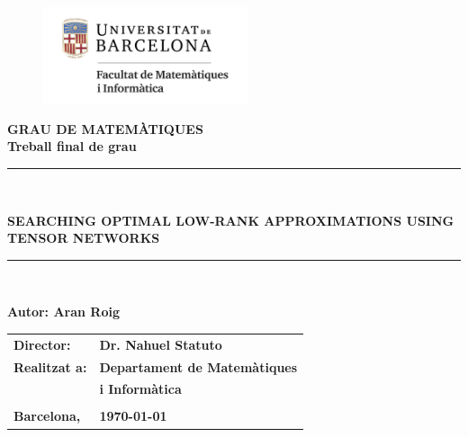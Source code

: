\documentclass[11pt,a4paper,openright,oneside]{book}
\numberwithin{equation}{section}
\begin{document}

\thispagestyle{empty}

\begin{titlepage}
\begin{center}
\begin{figure}[htb]
\begin{center}
\includegraphics[width=6cm]{matematiquesinformatica-pos-rgb.png}
\end{center}
\end{figure}

\vspace*{1cm}
\textbf{\LARGE GRAU DE MATEM\`{A}TIQUES } \\
\vspace*{.5cm}
\textbf{\LARGE Treball final de grau} \\

\vspace*{1.5cm}
\rule{16cm}{0.1mm}\\
\begin{Huge}
\textbf{SEARCHING OPTIMAL LOW-RANK APPROXIMATIONS USING TENSOR NETWORKS} \\
\end{Huge}
\rule{16cm}{0.1mm}\\

\vspace{1cm}

\begin{flushright}
\textbf{\LARGE Autor: Aran Roig}

\vspace*{2cm}

\renewcommand{\arraystretch}{1.5}
\begin{tabular}{ll}
\textbf{\Large Director:} & \textbf{\Large Dr. Nahuel Statuto} \\
\textbf{\Large Realitzat a:} & \textbf{\Large  Departament de Matemàtiques   } \\
 & \textbf{\Large i Informàtica} \\
\\
\textbf{\Large Barcelona,} & \textbf{\Large \today }
\end{tabular}

\end{flushright}

\end{center}



\end{titlepage}
\end{document}
